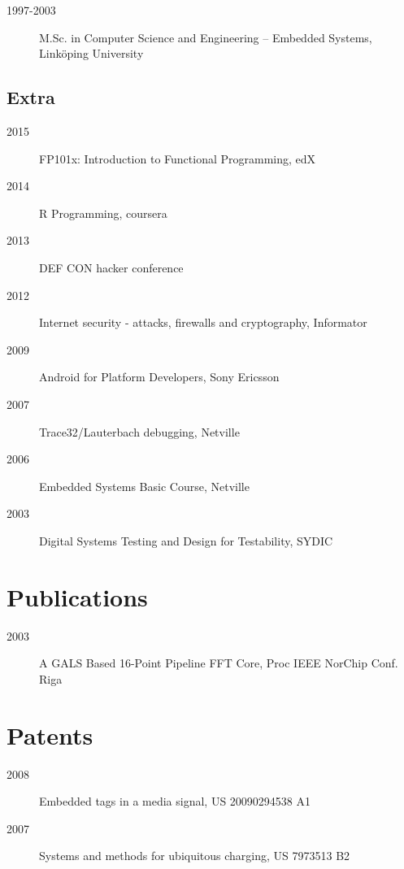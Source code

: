 \documentclass[ DIV=calc,%
                paper=a4,%
                fontsize=11pt,%
                twocolumn]{scrartcl}
\begin{document}
\begin{description}
    \item[1997-2003] M.Sc. in Computer Science and Engineering – Embedded Systems, Linköping University
\end{description}

\subsection*{Extra}

\begin{description}
    \item[2015] FP101x: Introduction to Functional Programming, edX
    \item[2014] R Programming, coursera
    \item[2013] DEF CON hacker conference
    \item[2012] Internet security - attacks, firewalls and cryptography, Informator
    \item[2009] Android for Platform Developers, Sony Ericsson
    \item[2007] Trace32/Lauterbach debugging, Netville
    \item[2006] Embedded Systems Basic Course, Netville
    \item[2003] Digital Systems Testing and Design for Testability, SYDIC
\end{description}

\section*{Publications}

\begin{description}
    \item[2003] A GALS Based 16-Point Pipeline FFT Core, Proc IEEE NorChip Conf. Riga
\end{description}

\section*{Patents}

\begin{description}
    \item[2008] Embedded tags in a media signal, US 20090294538 A1
    \item[2007] Systems and methods for ubiquitous charging, US 7973513 B2
\end{description}
\end{document}
